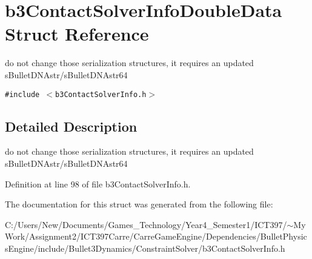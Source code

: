 \hypertarget{structb3_contact_solver_info_double_data}{
\section{b3ContactSolverInfoDoubleData Struct Reference}
\label{structb3_contact_solver_info_double_data}
}
do not change those serialization structures, it requires an updated sBulletDNAstr/sBulletDNAstr64  


{\tt \#include $<$b3ContactSolverInfo.h$>$}



\subsection{Detailed Description}
do not change those serialization structures, it requires an updated sBulletDNAstr/sBulletDNAstr64 

Definition at line 98 of file b3ContactSolverInfo.h.

The documentation for this struct was generated from the following file:\begin{CompactItemize}
\item 
C:/Users/New/Documents/Games\_\-Technology/Year4\_\-Semester1/ICT397/$\sim$My Work/Assignment2/ICT397Carre/CarreGameEngine/Dependencies/BulletPhysicsEngine/include/Bullet3Dynamics/ConstraintSolver/b3ContactSolverInfo.h\end{CompactItemize}
